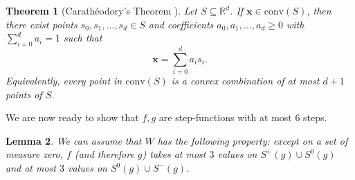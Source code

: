 \documentclass[11pt]{article}
\theoremstyle{plain}
\newtheorem{theorem}{Theorem}[section]
\newtheorem{lemma}[theorem]{Lemma}
\theoremstyle{definition}
\numberwithin{equation}{section}
\begin{document}
\begin{theorem}[Carath\'eodory's Theorem {\cite[Theorem 1.2.3]{Matousek_2002}}]\label{theorem:Caratheodory}
Let $S \subseteq \mathbb{R}^d$. If $\bm{x}\in\mathrm{conv}(S)$, then there exist points
$s_0,s_1,\ldots,s_d \in S$ and coefficients $a_0,a_1,\ldots,a_d \geq 0$ with
$\sum_{i=0}^d a_i = 1$ such that
\[
\bm{x} = \sum_{i=0}^d a_i s_i.
\]
Equivalently, every point in $\mathrm{conv}(S)$ is a convex combination of at most $d+1$ points of $S$.
\end{theorem}

We are now ready to show that $f,g$ are step-functions with at most 6 steps. 

\begin{lemma}\label{lemma:six_steps_f_g}
We can assume that $W$ has the following property: except on a set of measure zero, 
$f$ \textup{(}and therefore $g$\textup{)} takes at most $3$ values on $S^+(g)\cup S^0(g)$ 
and at most $3$ values on $S^0(g)\cup S^-(g)$. 
\end{lemma}
\end{document}
